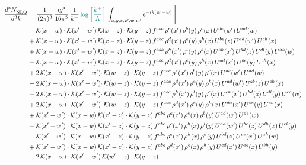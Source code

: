 \documentclass[9pt]{article}
\numberwithin{equation}{section}
\begin{document}
\begin{align}
     \frac{d^{3}N_{\rm NLO}^{\rm}}{d^{3}k}  & = \frac{1}{(2\pi)^{3}}\, \frac{ig^{4}}{16\pi^{5}}\, \frac{1}{k^{+}}\,{\color{teal}\log{\left[\frac{k^{+}}{\Lambda}\right]}}\, \int_{x,y,z,x^{\prime},w,w^{\prime}}e^{-ik(w^{\prime}-w)}\, \Bigg[\notag \\ & -\mathcal{K}(x-w)\cdot \mathcal{K}(x'-w')\, \mathcal{K}(x-z)\cdot \mathcal{K}(y-z)\, f^{abc}\, \rho^{e}(x')\,\rho^{b}(y)\,\rho^{c}(x)\,U^{de}(w')\,U^{ad}(w)\notag \\ & + \mathcal{K}(x-w)\cdot \mathcal{K}(x'-w')\, \mathcal{K}(x-z)\cdot \mathcal{K}(y-z)\, f^{abc}\, \rho^{d}(x')\,\rho^{e}(y)\,\rho^{h}(x)\,U^{be}(z)\,U^{ad}(w')\,U^{ch}(x)\notag \\ & + \mathcal{K}(x-w)\cdot \mathcal{K}(x'-w')\, \mathcal{K}(x-z)\cdot \mathcal{K}(y-z)\, f^{abc}\, \rho^{h}(x')\,\rho^{l}(y)\,\rho^{c}(x)\,U^{eh}(x')\,U^{bd}(z)\,U^{dl}(y)\,U^{ae}(w)\notag \\ & -\mathcal{K}(x-w)\cdot \mathcal{K}(x'-w')\, \mathcal{K}(x-z)\cdot \mathcal{K}(y-z)\, f^{abc}\, \rho^{d}(x')\,\rho^{e}(y)\,\rho^{h}(x)\,U^{ad}(x')\,U^{be}(y)\,U^{ch}(x)\notag \\ & + 2\,\mathcal{K}(x-w)\cdot \mathcal{K}(x'-w'){\color{red}\cdot}{\color{blue}\,} \mathcal{K}(w-z)\cdot \mathcal{K}(y-z)\, f^{abc}\, \rho^{e}(x')\,\rho^{b}(y)\,\rho^{c}(x)\,U^{de}(w')\,U^{ad}(w)\notag \\ & - 2\,\mathcal{K}(x-w)\cdot \mathcal{K}(x'-w'){\color{red}\cdot}{\color{blue}\,} \mathcal{K}(w-z)\cdot \mathcal{K}(y-z)\, f^{abc}\, \rho^{d}(x')\,\rho^{e}(y)\,\rho^{h}(x)\,U^{ad}(w')\,U^{eb}(z)\,U^{ch}(x)\notag \\ & - 2\,\mathcal{K}(x-w)\cdot \mathcal{K}(x'-w'){\color{red}\cdot}{\color{blue}\,} \mathcal{K}(w-z)\cdot \mathcal{K}(y-z)\, f^{abc}\, \rho^{h}(x')\,\rho^{l}(y)\,\rho^{c}(x)\,U^{eh}(x')\,U^{bd}(z)\,U^{dl}(y)\,U^{ea}(w)\notag \\ &  + 2\,\mathcal{K}(x-w)\cdot \mathcal{K}(x'-w'){\color{red}\cdot}{\color{blue}\,} \mathcal{K}(w-z)\cdot \mathcal{K}(y-z)\, f^{abc}\, \rho^{d}(x')\,\rho^{e}(y)\,\rho^{h}(x)\,U^{da}(x')\,U^{be}(y)\,U^{ch}(x)\notag \\ & + \mathcal{K}(x'-w')\cdot \mathcal{K}(x-w)\, \mathcal{K}(x'-z)\cdot \mathcal{K}(y-z)\, f^{abc}\,\rho^{c}(x')\,\rho^{e}(x)\,\rho^{b}(y)\, U^{ad}(w')\,U^{de}(w)\notag \\ & -\mathcal{K}(x'-w')\cdot \mathcal{K}(x-w)\, \mathcal{K}(x'-z)\cdot \mathcal{K}(y-z)\, f^{abc}\,\rho^{c}(x')\,\rho^{h}(x)\,\rho^{l}(y)\, U^{ad}(w')\,U^{be}(z)\,U^{dh}(x)\,U^{el}(y)\notag \\ & -\mathcal{K}(x'-w')\cdot \mathcal{K}(x-w)\, \mathcal{K}(x'-z)\cdot \mathcal{K}(y-z)\, f^{abc}\,\rho^{e}(x')\,\rho^{h}(x)\,\rho^{d}(y)\, U^{bd}(z)\,U^{ce}(x')\,U^{ah}(w)\notag \\ & +\mathcal{K}(x'-w')\cdot \mathcal{K}(x-w)\, \mathcal{K}(x'-z)\cdot \mathcal{K}(y-z)\, f^{abc}\,\rho^{d}(x')\,\rho^{e}(x)\,\rho^{h}(y)\, U^{cd}(x')\,U^{ae}(x)\,U^{bh}(y)\notag \\ & -2\, \mathcal{K}(x-w)\cdot \mathcal{K}(x'-w')\, \mathcal{K}(w'-z)\cdot \mathcal{K}(y-z)\, 
\end{align}
\end{document}
